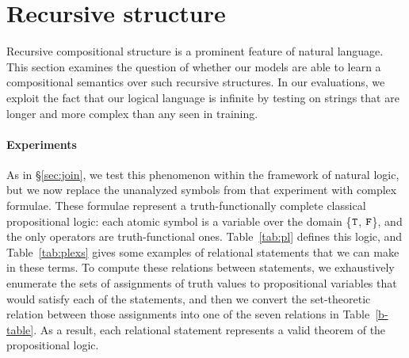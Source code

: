 \section{Recursive structure}\label{sec:recursion}



Recursive compositional structure is a prominent feature of natural language. 
This section examines the 
question of whether our models are able to learn a 
compositional semantics over such recursive structures.
In our evaluations, we exploit the fact that our logical language
is infinite by testing on strings that are longer and more complex
than any seen in training.


\paragraph{Experiments}
As in \S\ref{sec:join}, we test this phenomenon within the
framework of natural logic, but we now replace the unanalyzed symbols
from that experiment with complex formulae. These formulae
represent a truth-functionally complete classical propositional logic:
each atomic symbol is a variable over the domain \{$\texttt{T}$, $\texttt{F}$\}, and the only
operators are truth-functional ones.  Table~\ref{tab:pl} defines this
logic, and Table~\ref{tab:plexs} gives some examples of relational
statements that we can make in these terms. To compute these relations
between statements, we exhaustively enumerate the sets of assignments
of truth values to propositional variables that would satisfy each of
the statements, and then we convert the set-theoretic relation between
those assignments into one of the seven relations in
Table~\ref{b-table}. As a result, each relational statement represents
a valid theorem of the propositional logic.

